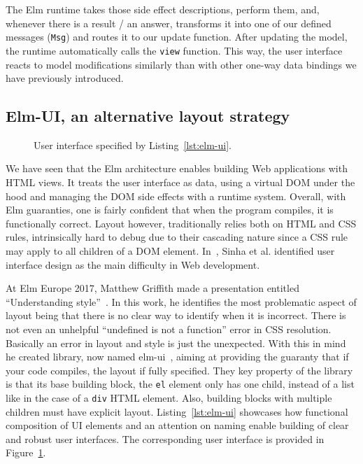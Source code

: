 The Elm runtime takes those side effect descriptions,
perform them, and, whenever there is a result / an answer,
transforms it into one of our defined messages (\verb|Msg|)
and routes it to our update function.
After updating the model, the runtime automatically calls the \verb|view| function.
This way, the user interface reacts to model modifications
similarly than with other one-way data bindings we have previously introduced.


\subsection{Elm-UI, an alternative layout strategy}%
\label{sub:elm_ui_an_alternative_layout_strategy}

\begin{figure}[ht]
	\centering
	\setlength{\fboxsep}{0pt}
	\caption{User interface specified by Listing~\ref{lst:elm-ui}.}%
	\label{fig:elm-ui}
\end{figure}

We have seen that the Elm architecture enables building Web applications with HTML views.
It treats the user interface as data, using a virtual DOM under the hood
and managing the DOM side effects with a runtime system.
Overall, with Elm guaranties, one is fairly confident that when
the program compiles, it is functionally correct.
Layout however, traditionally relies both on HTML and CSS rules,
intrinsically hard to debug due to their cascading nature
since a CSS rule may apply to all children of a DOM element.
In~\cite{sinha2015simplifying}, Sinha et al. identified user interface design
as the main difficulty in Web development.

At Elm Europe 2017, Matthew Griffith made a presentation
entitled ``Understanding style''~\cite{griffithstyle}.
In this work, he identifies the most problematic aspect of layout being
that there is no clear way to identify when it is incorrect.
There is not even an unhelpful ``undefined is not a function'' error in CSS resolution.
Basically an error in layout and style is just the unexpected.
With this in mind he created library, now named elm-ui~\cite{griffithelmui},
aiming at providing the guaranty that if your code compiles,
the layout if fully specified.
They key property of the library is that its base building block,
the \verb|el| element only has one child,
instead of a list like in the case of a \verb|div| HTML element.
Also, building blocks with multiple children must have explicit layout.
Listing~\ref{lst:elm-ui} showcases how functional composition of UI elements
and an attention on naming enable building of clear and robust user interfaces.
The corresponding user interface is provided in Figure~\ref{fig:elm-ui}.

